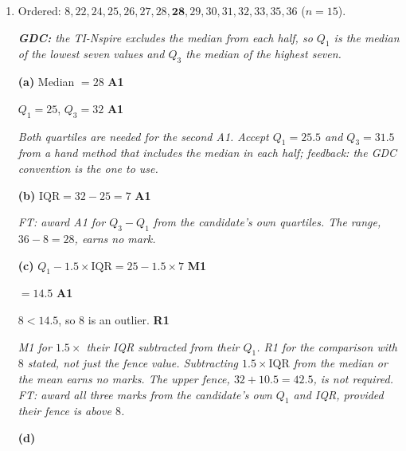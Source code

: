 \documentclass[12pt, twoside]{article}
\begin{document}
\begin{enumerate}[itemsep=0.3cm]
\newpage

\item[2.] [Maximum mark: 9]

Ordered: $8, 22, 24, 25, 26, 27, 28, \mathbf{28}, 29, 30, 31, 32, 33, 35,
36$ \quad ($n = 15$).

\emph{\textbf{GDC:} the TI-Nspire excludes the median from each half, so
$Q_{1}$ is the median of the lowest seven values and $Q_{3}$ the median of
the highest seven.}

\textbf{(a)} Median $= 28$ \hfill \textbf{A1}

$Q_{1} = 25$, \quad $Q_{3} = 32$ \hfill \textbf{A1}

\emph{Both quartiles are needed for the second A1. Accept $Q_{1} = 25.5$ and
$Q_{3} = 31.5$ from a hand method that includes the median in each half;
feedback: the GDC convention is the one to use.}

\textbf{(b)} $\text{IQR} = 32 - 25 = 7$ \hfill \textbf{A1}

\emph{FT: award A1 for $Q_{3} - Q_{1}$ from the candidate's own quartiles.
The range, $36 - 8 = 28$, earns no mark.}

\textbf{(c)} $Q_{1} - 1.5 \times \text{IQR} = 25 - 1.5 \times 7$
\hfill \textbf{M1}

$= 14.5$ \hfill \textbf{A1}

$8 < 14.5$, so $8$ is an outlier. \hfill \textbf{R1}

\emph{M1 for $1.5 \times$ their IQR subtracted from their $Q_{1}$. R1 for
the comparison with $8$ stated, not just the fence value. Subtracting
$1.5 \times \text{IQR}$ from the median or the mean earns no marks. The
upper fence, $32 + 10.5 = 42.5$, is not required. FT: award all three marks
from the candidate's own $Q_{1}$ and IQR, provided their fence is above $8$.}

\textbf{(d)}

\begin{center}
\end{center}


\end{enumerate}
\end{document}

